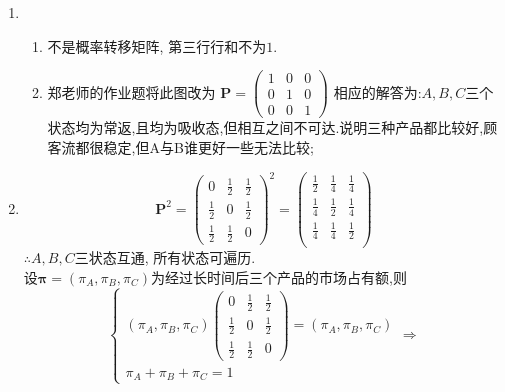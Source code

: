 \begin{solution}
	\begin{enumerate}[label=(\arabic*)]
		\item \begin{enumerate}[label=(\alph*)]
			      \item 不是概率转移矩阵, 第三行行和不为$1$.
			      \item 郑老师的作业题将此图改为
			            $\bm{P}=
				            \begin{pmatrix}
					            1 & 0 & 0 \\
					            0 & 1 & 0 \\
					            0 & 0 & 1
				            \end{pmatrix}$
			            相应的解答为:$A,B,C$三个状态均为常返,且均为吸收态,但相互之间不可达.说明三种产品都比较好,顾客流都很稳定,但A与B谁更好一些无法比较;
		      \end{enumerate}
		\item \[
			      \bm{P}^2 =
			      \begin{pmatrix}
				      0           & \frac{1}{2} & \frac{1}{2} \\
				      \frac{1}{2} & 0           & \frac{1}{2} \\
				      \frac{1}{2} & \frac{1}{2} & 0
			      \end{pmatrix}^2 =
			      \begin{pmatrix}
				      \frac{1}{2} & \frac{1}{4} & \frac{1}{4} \\
				      \frac{1}{4} & \frac{1}{2} & \frac{1}{4} \\
				      \frac{1}{4} & \frac{1}{4} & \frac{1}{2} \\
			      \end{pmatrix}
		      \]
		      $\therefore A,B,C$三状态互通, 所有状态可遍历.\\
		      设$\bm{\pi}=(\pi_A,\pi_B,\pi_C)$为经过长时间后三个产品的市场占有额,则
		      \[
			      \begin{cases}
				      (\pi_A,\pi_B,\pi_C)
				      \begin{pmatrix}
					      0           & \frac{1}{2} & \frac{1}{2} \\
					      \frac{1}{2} & 0           & \frac{1}{2} \\
					      \frac{1}{2} & \frac{1}{2} & 0
				      \end{pmatrix} = (\pi_A,\pi_B,\pi_C) \\
				      \pi_A+\pi_B+\pi_C = 1
			      \end{cases} \Rightarrow
\]
\end{enumerate}
\end{solution}
